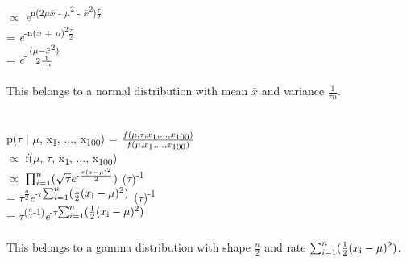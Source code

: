 \documentclass{article}
\begin{document}
$\propto$ \textit{e}\textsuperscript{n(2$\mu$$\bar{x}$ - $\mu$\textsuperscript{2} - $\bar{x}$\textsuperscript{2})$\frac{\tau}{2}$} \\
=  \textit{e}\textsuperscript{-n($\bar{x}$ + $\mu$)\textsuperscript{2}$\frac{\tau}{2}$}\\
= \textit{e}\textsuperscript{-$\frac{(\mu - \bar{x}\textsuperscript{2})}{2\frac{1}{\tau n}}$}\\\\
This belongs to a normal distribution with mean $\bar{x}$ and variance $\frac{1}{\tau n}$.\\\\\\
p($\tau$ $\vert$ $\mu$, x\textsubscript{1}, ..., x\textsubscript{100}) = $\frac{f(\mu, \tau, x\textsubscript{1}, ..., x\textsubscript{100})}{f(\mu, x\textsubscript{1}, ..., x\textsubscript{100})}$\\
$\propto$ f($\mu$, $\tau$, x\textsubscript{1}, ..., x\textsubscript{100})\\
$\propto$ $\prod_{i=1}^{n} (\sqrt{\tau}e\textsuperscript{-$\frac{\tau(x-\mu)\textsuperscript{2}}{2}$})$ ($\tau$)\textsuperscript{-1}\\
= $\tau$\textsuperscript{$\frac{n}{2}$}\textit{e}\textsuperscript{-$\tau$$\sum_{i=1}^{n} (\frac{1}{2}(x\textsubscript{i} - \mu)\textsuperscript{2})$} ($\tau$)\textsuperscript{-1}\\
= $\tau$\textsuperscript{($\frac{n}{2}$-1)}\textit{e}\textsuperscript{-$\tau$$\sum_{i=1}^{n} (\frac{1}{2}(x\textsubscript{i} - \mu)\textsuperscript{2})$}\\\\
This belongs to a gamma distribution with shape $\frac{n}{2}$ and rate $\sum_{i=1}^{n} (\frac{1}{2}(x\textsubscript{i} - \mu)\textsuperscript{2})$.\\
\end{document}

